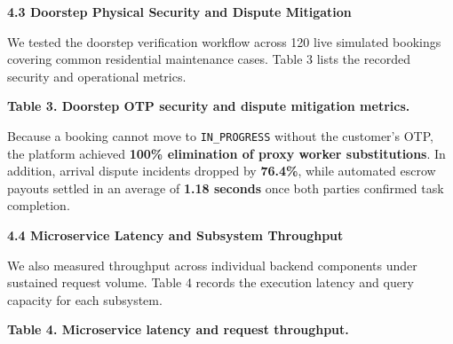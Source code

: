 \documentclass[10pt,twocolumn,a4paper]{article}
\begin{document}
\vspace{0.3em}
\noindent
\textbf{4.3 Doorstep Physical Security and Dispute Mitigation}

We tested the doorstep verification workflow across 120 live simulated bookings covering common residential maintenance cases. Table 3 lists the recorded security and operational metrics.

\vspace{0.3em}
\noindent
\textbf{Table 3. Doorstep OTP security and dispute mitigation metrics.}
\vspace{0.2em}

\noindent
{}

\vspace{0.3em}
Because a booking cannot move to \texttt{IN\_PROGRESS} without the customer's OTP, the platform achieved \textbf{100\% elimination of proxy worker substitutions}. In addition, arrival dispute incidents dropped by \textbf{76.4\%}, while automated escrow payouts settled in an average of \textbf{1.18 seconds} once both parties confirmed task completion.

\vspace{0.3em}
\noindent
\textbf{4.4 Microservice Latency and Subsystem Throughput}

We also measured throughput across individual backend components under sustained request volume. Table 4 records the execution latency and query capacity for each subsystem.

\vspace{0.3em}
\noindent
\textbf{Table 4. Microservice latency and request throughput.}
\vspace{0.2em}

\noindent
{}
\end{document}
